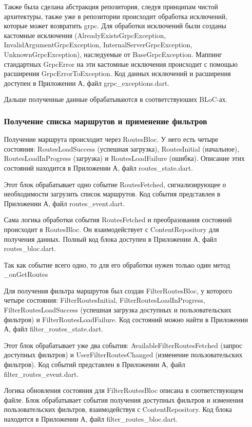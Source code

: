 Также была сделана абстракция репозитория, следуя принципам чистой архитектуры, также уже в репозитории происходит обработка исключений, которые может возвратить grpc. Для обработки исключений были созданы кастомные исключения (AlreadyExistsGrpcException, InvalidArgumentGrpcException, InternalServerGrpcException, UnknownGrpcException), наследуемые от BaseGrpcException. Маппинг стандартных GrpcError на эти кастомные исключения происходит с помощью расширения GrpcErrorToException. Код данных исключений и расширения доступен в Приложении А, файл grpc\_exceptions.dart.

Дальше полученные данные обрабатываются в соответствуюших BLoC-ах.

\subsubsection*{Получение списка маршрутов и применение фильтров}

Получение маршрута происходит через RoutesBloc. У него есть четыре состояния: RoutesLoadSuccess (успешная загрузка), RoutesInitial (начальное), RoutesLoadInProgress (загрузка) и RoutesLoadFailure (ошибка). Описание этих состояний находится в Приложении А, файл routes\_state.dart.

Этот блок обрабатывает одно событие RoutesFetched, сигнализирующее о необходимости загрузить список маршрутов. Код события представлен в Приложении А, файл routes\_event.dart.

Сама логика обработки события RoutesFetched и преобразования состояний происходит в RoutesBloc. Он взаимодействует с ContentRepository для получения данных. Полный код блока доступен в Приложении А, файл routes\_bloc.dart.

Так как событие всего одно, то для его обработки нужен только один метод \_onGetRoutes

Для получения фильтра маршрутов был создан FilterRoutesBloc, у которого четыре состояния: FilterRoutesInitial, FilterRoutesLoadInProgress, FilterRoutesLoadSuccess (успешная загрузка доступных и пользовательских фильтров) и FilterRoutesLoadFailure. Код состояний можно найти в Приложении А, файл filter\_routes\_state.dart.

Этот блок обрабатывает уже два события: AvailableFilterRoutesFetched (запрос доступных фильтров) и UserFilterRoutesChanged (изменение пользовательских фильтров). Код событий представлен в Приложении А, файл filter\_routes\_event.dart.

Логика обновления состояния для FilterRoutesBloc описана в соответствующем файле. Блок обрабатывает события получения доступных фильтров и изменения пользовательских фильтров, взаимодействуя с ContentRepository. Код блока находится в Приложении А, файл filter\_routes\_bloc.dart.

